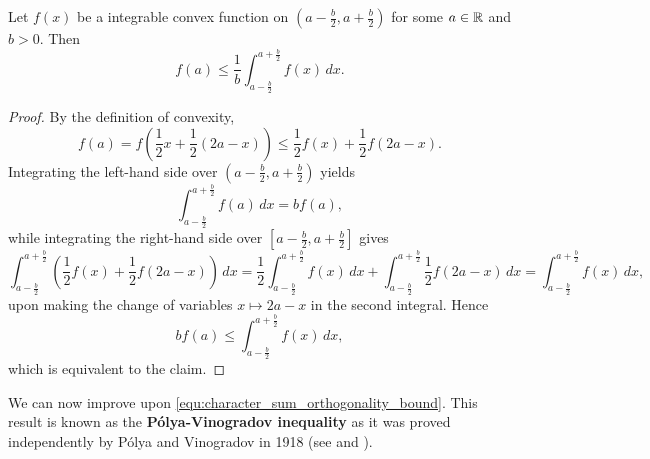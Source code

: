     \begin{lemma}\label{lem:Polya-Vinogradov_lemma}
      Let $f(x)$ be a integrable convex function on $\left(a-\frac{b}{2},a+\frac{b}{2}\right)$ for some $a \in \mathbb{R}$ and $b > 0$. Then
      \[
        f(a) \le \frac{1}{b}\int_{a-\frac{b}{2}}^{a+\frac{b}{2}}f(x)\,dx.
      \]
    \end{lemma}
    \begin{proof}
      By the definition of convexity,
      \[
        f(a) = f\left(\frac{1}{2}x+\frac{1}{2}(2a-x)\right) \le \frac{1}{2}f(x)+\frac{1}{2}f(2a-x).
      \]
      Integrating the left-hand side over $\left(a-\frac{b}{2},a+\frac{b}{2}\right)$ yields
      \[
        \int_{a-\frac{b}{2}}^{a+\frac{b}{2}}f(a)\,dx = bf(a),
      \]
      while integrating the right-hand side over $\left[a-\frac{b}{2},a+\frac{b}{2}\right]$ gives
      \[
        \int_{a-\frac{b}{2}}^{a+\frac{b}{2}}\left(\frac{1}{2}f(x)+\frac{1}{2}f(2a-x)\right)\,dx = \frac{1}{2}\int_{a-\frac{b}{2}}^{a+\frac{b}{2}}f(x)\,dx+\int_{a-\frac{b}{2}}^{a+\frac{b}{2}}\frac{1}{2}f(2a-x)\,dx = \int_{a-\frac{b}{2}}^{a+\frac{b}{2}}f(x)\,dx,
      \]
      upon making the change of variables $x \mapsto 2a-x$ in the second integral. Hence
      \[
        bf(a) \le \int_{a-\frac{b}{2}}^{a+\frac{b}{2}}f(x)\,dx,
      \]
      which is equivalent to the claim.
    \end{proof}
    
    We can now improve upon \cref{equ:character_sum_orthogonality_bound}. This result is known as the \textbf{P\'olya-Vinogradov inequality} as it was proved independently by P\'olya and Vinogradov in 1918 (see \cite{polya1918verteilung} and \cite{vinogradov1918distribution}).

